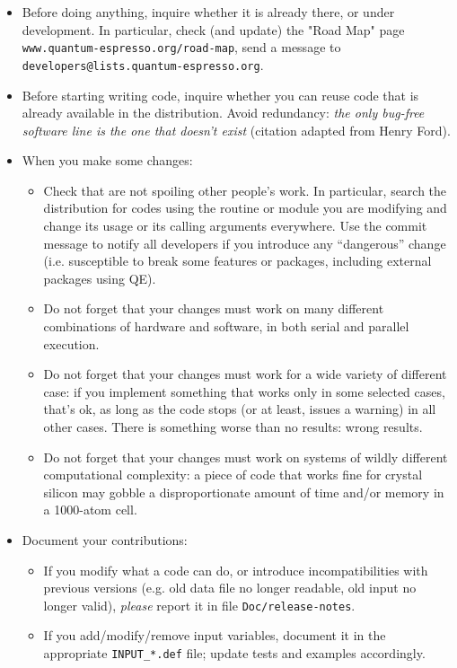 \documentclass[12pt,a4paper]{article}
\def\qe{QE}
\begin{document}
\begin{itemize}
\item Before doing anything, inquire whether it is already there,
or under development. In particular, check (and update) the "Road Map"
page \texttt{www.quantum-espresso.org/road-map}, send a message to
\texttt{developers@lists.quantum-espresso.org}.
\item Before starting writing code, inquire whether you can reuse
code that is already available in the distribution. Avoid redundancy:
{\em the only bug-free software line is the one that doesn't exist}
(citation adapted from Henry Ford).
\item When you make some changes:
\begin{itemize}
\item Check that are not spoiling other people's work. In particular,
search the distribution for codes using the routine or module you are
modifying and change its usage or its calling arguments everywhere.
Use the commit message to notify all developers if you introduce any
``dangerous'' change (i.e. susceptible to break some features or
packages, including external packages using \qe).
\item Do not forget that your changes must work on many different
combinations of hardware and software, in both serial and parallel execution.
\item Do not forget that your changes must work for a wide variety of
different case: if you implement something that works only in some
selected cases, that's ok, as long as the code stops (or at least,
issues a warning) in all other cases. There is something worse than
no results: wrong results.
\item Do not forget that your changes must work on systems of wildly
different computational complexity: a piece of code that works fine for
crystal silicon may gobble a disproportionate amount of time and/or
memory in a 1000-atom cell.
\end{itemize}
\item Document your contributions:
\begin{itemize}
\item If you modify what a code can do, or introduce
incompatibilities with previous versions (e.g. old data file
no longer readable, old input no longer valid), {\em please}
report it in file \texttt{Doc/release-notes}.
\item If you add/modify/remove input variables, document
  it in the appropriate \texttt{INPUT\_*.def} file;
  update tests and examples accordingly.

\end{itemize}
\end{itemize}
\end{document}
